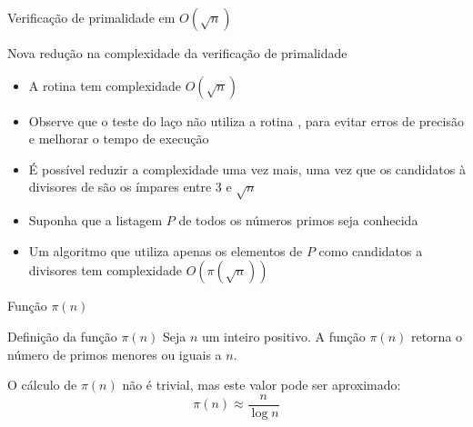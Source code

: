 \begin{frame}[fragile]{Verificação de primalidade em $O(\sqrt{n})$}
\end{frame}

\begin{frame}[fragile]{Nova redução na complexidade da verificação de primalidade}

    \begin{itemize}
        \item A rotina  tem complexidade $O(\sqrt{n})$

        \item Observe que o teste do laço não utiliza a rotina , para evitar 
            erros de precisão e melhorar o tempo de execução

        \item É possível reduzir a complexidade uma vez mais, uma vez que os candidatos à 
            divisores de  são os ímpares entre 3 e $\sqrt{n}$

        \item Suponha que a listagem $P$ de todos os números primos seja conhecida

        \item Um algoritmo que utiliza apenas os elementos de $P$
            como candidatos a divisores tem complexidade $O(\pi(\sqrt{n}))$
    \end{itemize}

\end{frame}


\begin{frame}[fragile]{Função $\pi(n)$}

    \begin{block}{Definição da função $\pi(n)$}
        Seja $n$ um inteiro positivo. A função $\pi(n)$ retorna o número de primos menores
        ou iguais a $n$.
    \end{block}

O cálculo de $\pi(n)$ não é trivial, mas este valor pode ser aproximado:
$$
    \pi(n) \approx \frac{n}{\log n}
$$

\end{frame}
